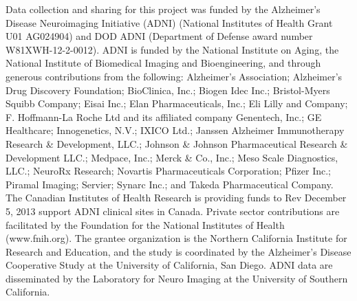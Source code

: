 \documentclass[authoryear,preprint,revi	ew,12pt]{elsarticle}
\begin{document}
Data collection and sharing for this project was funded by the Alzheimer\textquoteright s Disease Neuroimaging Initiative (ADNI) (National Institutes of Health Grant U01 AG024904) and DOD ADNI (Department of Defense award number W81XWH-12-2-0012). ADNI is funded by the National Institute on Aging, the National Institute of Biomedical Imaging and Bioengineering, and through generous contributions from the following: Alzheimer's Association; Alzheimer\textquoteright s Drug Discovery Foundation; BioClinica, Inc.; Biogen Idec Inc.; Bristol-Myers Squibb Company; Eisai Inc.; Elan Pharmaceuticals, Inc.; Eli Lilly and Company; F. Hoffmann-La Roche Ltd and its affiliated company Genentech, Inc.; GE Healthcare; Innogenetics, N.V.; IXICO Ltd.; Janssen Alzheimer Immunotherapy Research \& Development, LLC.; Johnson \& Johnson Pharmaceutical Research \& Development LLC.; Medpace, Inc.; Merck \& Co., Inc.; Meso Scale Diagnostics, LLC.; NeuroRx Research; Novartis Pharmaceuticals Corporation; Pfizer Inc.; Piramal Imaging; Servier; Synarc Inc.; and Takeda Pharmaceutical Company. The Canadian Institutes of Health Research is providing funds to Rev December 5, 2013
support ADNI clinical sites in Canada. Private sector contributions are facilitated by the Foundation for the National Institutes of Health (www.fnih.org). The grantee organization is the Northern California Institute for Research and Education, and the study is coordinated by the Alzheimer\textquoteright s Disease Cooperative Study at the University of California, San Diego. ADNI data are disseminated by the Laboratory for Neuro Imaging at the University of Southern California.

\appendix
\end{document}
